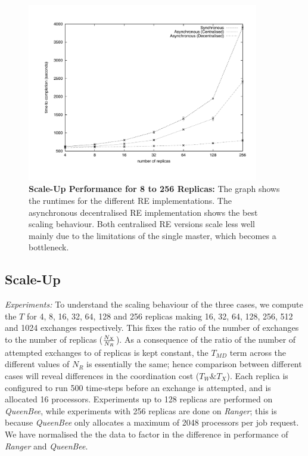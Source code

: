 \documentclass{rspublic}
\newcommand{\alnote}[1]{ {\textcolor{blue} { ***andre: #1 }}}
\newcommand{\alnote}[1]{}
\begin{document}
%
\begin{figure}
\centering
\includegraphics[width=0.9\textwidth]{../data/scale_up.pdf}
\caption{\small \textbf{Scale-Up Performance for 8 to 256 Replicas:}
  The graph shows the runtimes for the different RE implementations.
  The asynchronous decentralised RE implementation shows the best
  scaling behaviour. Both centralised RE versions scale less well
  mainly due to the limitations of the single master, which becomes a
  bottleneck.}
\label{fig:scaleup}
\vspace{-1em}
\end{figure}


\subsection{Scale-Up}


{\it Experiments: } To understand the scaling behaviour of the three
cases, we compute the $T$ for 4, 8, 16, 32, 64, 128 and 256 replicas
making 16, 32, 64, 128, 256, 512 and 1024 exchanges respectively. This
fixes the ratio of the number of exchanges to the number of replicas
($N_X \over N_R$).  As a consequence of the ratio of the number of
attempted exchanges to of replicas is kept constant, the $T_{MD}$ term
across the different values of $N_R$ is essentially the same; hence
comparison between different cases will reveal differences in the
coordination cost ($T_W \& T_X$).  Each replica is configured to run
500 time-steps before an exchange is attempted, and is allocated 16
processors. Experiments up to 128 replicas are performed on {\it
  QueenBee}, while experiments with 256 replicas are done on
\emph{Ranger}; this is because \emph{QueenBee} only allocates a
maximum of 2048 processors per job request. We have normalised the the
data to factor in the difference in performance of {\it Ranger} and
{\it QueenBee}.
\end{document}
